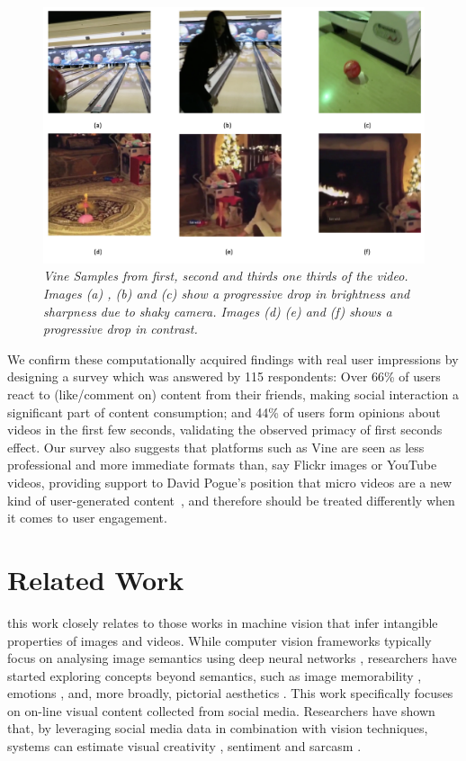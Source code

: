 \begin{figure}[!tbh]
    \centering
    \includegraphics[width=0.7\columnwidth]{Vine_samples2.png}
    \caption{\textsl{ Vine Samples from first, second and thirds one thirds of the video. Images (a) , (b) and (c) show a progressive drop in brightness and sharpness due to shaky camera. Images (d) (e) and (f) shows a progressive drop in contrast.}}
    \label{fig:Vine_samples}
\end{figure}

We confirm these computationally acquired findings with real user impressions by designing a survey which was answered by 115 respondents: Over 66\% of users react to (like/comment on) content from their friends, making social interaction a significant part of content consumption; and 44\% of users form opinions about videos in the first few seconds, validating the observed primacy of first seconds effect. Our survey also suggests that platforms such as Vine are seen as less professional and more immediate formats than, say Flickr images or YouTube videos, providing support to David Pogue's  position that micro videos are a new kind of user-generated content~\cite{pogue13}, and therefore should be treated differently when it comes to user engagement.



\section{ Related Work}
this work closely relates to those works  in machine vision that infer intangible properties of images and videos. While  computer vision frameworks typically focus on analysing image semantics using deep neural networks \cite{krizhevsky2012imagenet}, researchers have started exploring concepts beyond semantics, such as image memorability \cite{isola2011makes}, emotions \cite{Machajdik}, and, more broadly, pictorial aesthetics \cite{datta2008algorithmic,luo2008photo,goodSelfie}. 
This work specifically focuses on on-line visual content collected from social media. Researchers have shown that, by leveraging social media data in combination with vision techniques, systems can estimate visual creativity \cite{redi20146},  sentiment \cite{wang2015inferring,jou2015visual} and sarcasm \cite{schifanella2016detecting}. %

